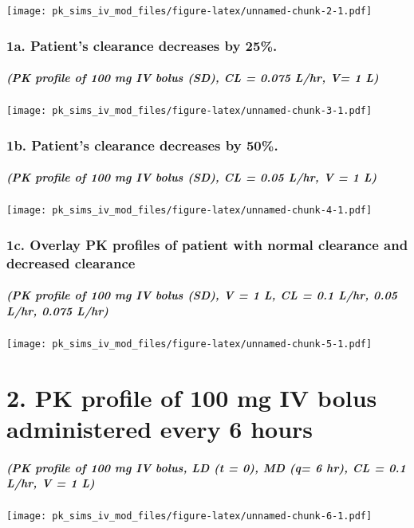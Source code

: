 \documentclass[]{article}
\begin{document}
\texttt{[image: pk\_sims\_iv\_mod\_files/figure-latex/unnamed-chunk-2-1.pdf]}

\subsubsection{1a. Patient's clearance decreases by
25\%.}\label{a.-patients-clearance-decreases-by-25.}

\subparagraph{(PK profile of 100 mg IV bolus (SD), CL = 0.075 L/hr, V= 1
L)}\label{pk-profile-of-100-mg-iv-bolus-sd-cl-0.075-lhr-v-1-l}

\texttt{[image: pk\_sims\_iv\_mod\_files/figure-latex/unnamed-chunk-3-1.pdf]}

\subsubsection{1b. Patient's clearance decreases by
50\%.}\label{b.-patients-clearance-decreases-by-50.}

\subparagraph{(PK profile of 100 mg IV bolus (SD), CL = 0.05 L/hr, V = 1
L)}\label{pk-profile-of-100-mg-iv-bolus-sd-cl-0.05-lhr-v-1-l}

\texttt{[image: pk\_sims\_iv\_mod\_files/figure-latex/unnamed-chunk-4-1.pdf]}

\subsubsection{1c. Overlay PK profiles of patient with normal clearance
and decreased
clearance}\label{c.-overlay-pk-profiles-of-patient-with-normal-clearance-and-decreased-clearance}

\subparagraph{(PK profile of 100 mg IV bolus (SD), V = 1 L, CL = 0.1
L/hr, 0.05 L/hr, 0.075
L/hr)}\label{pk-profile-of-100-mg-iv-bolus-sd-v-1-l-cl-0.1-lhr-0.05-lhr-0.075-lhr}

\texttt{[image: pk\_sims\_iv\_mod\_files/figure-latex/unnamed-chunk-5-1.pdf]}

\section{2. PK profile of 100 mg IV bolus administered every 6
hours}\label{pk-profile-of-100-mg-iv-bolus-administered-every-6-hours}

\subparagraph{(PK profile of 100 mg IV bolus, LD (t = 0), MD (q= 6 hr),
CL = 0.1 L/hr, V = 1
L)}\label{pk-profile-of-100-mg-iv-bolus-ld-t-0-md-q-6-hr-cl-0.1-lhr-v-1-l}

\texttt{[image: pk\_sims\_iv\_mod\_files/figure-latex/unnamed-chunk-6-1.pdf]}
\end{document}
